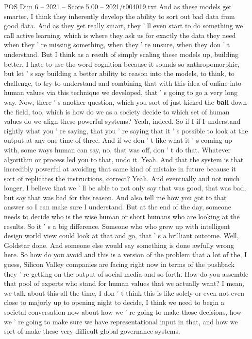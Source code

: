 \begin{textsample}{POS Dim 6 – 2021 – Score 5.00 – 2021/t004019.txt}
And as these models get smarter, I think they inherently develop the ability to sort out bad data from good data.
And as they get really smart, they ' ll even start to do something we call active learning, which is where they ask us for exactly the data they need when they ' re missing something, when they ' re unsure, when they don ' t understand.
But I think as a result of simply scaling these models up, building better, I hate to use the word cognition because it sounds so anthropomorphic, but let ' s say building a better ability to reason into the models, to think, to challenge, to try to understand and combining that with this idea of online into human values via this technique we developed, that ' s going to go a very long way.
Now, there ' s another question, which you sort of just kicked the \textbf{ball} down the field, too, which is how do we as a society decide to which set of human values do we align these powerful systems?
Yeah, indeed.
So if I if I understand rightly what you ' re saying, that you ' re saying that it ' s possible to look at the output at any one time of three.
And if we don ' t like what it ' s coming up with, some ways human can say, no, that was off, don ' t do that.
Whatever algorithm or process led you to that, undo it.
Yeah.
And that the system is that incredibly powerful at avoiding that same kind of mistake in future because it sort of replicates the instructions, correct?
Yeah.
And eventually and not much longer, I believe that we ' ll be able to not only say that was good, that was bad, but say that was bad for this reason.
And also tell me how you got to that answer so I can make sure I understand.
But at the end of the day, someone needs to decide who is the wise human or short humans who are looking at the results.
So it ' s a big difference.
Someone who who grew up with intelligent design world view could look at that and go, that ' s a brilliant outcome.
Well, Goldstar done.
And someone else would say something is done awfully wrong here.
So how do you avoid and this is a version of the problem that a lot of the, I guess, Silicon Valley companies are facing right now in terms of the pushback they ' re getting on the output of social media and so forth.
How do you assemble that pool of experts who stand for human values that we actually want?
I mean, we talk about this all the time, I don ' t think this is like solely or even not even close to majorly up to opening night to decide, I think we need to begin a societal conversation now about how we ' re going to make those decisions, how we ' re going to make sure we have representational input in that, and how we sort of make these very difficult global governance systems.

\end{textsample}

